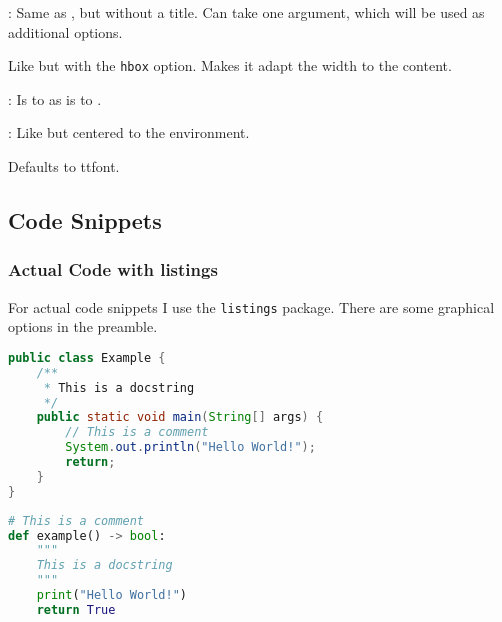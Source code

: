 \documentclass[
../../Summary.tex,
]
{subfiles}
\begin{document}
\begin{codebox*}
    : Same as , but without a title. Can take one argument, which will be used as additional options.
\end{codebox*}

\begin{smallcodebox}
    [smallcodebox]
    Like  but with the \texttt{hbox} option. Makes it adapt the width to the content.
\end{smallcodebox}

\begin{smallcodebox*}
    : Is to  as  is to .
\end{smallcodebox*}

\begin{cscb*}
    : Like  but centered to the environment.
\end{cscb*}

 Defaults to ttfont.

\subsection{Code Snippets}
\subsubsection{Actual Code with listings}
For actual code snippets I use the \texttt{listings} package. There are some graphical options in the preamble.

\begin{codebox}
    \begin{lstlisting}[language=Java]
public class Example {
    /**
     * This is a docstring
     */
    public static void main(String[] args) {
        // This is a comment
        System.out.println("Hello World!");
        return;
    }
}\end{lstlisting}
\end{codebox}

\begin{codebox}
    \begin{lstlisting}[language=Python]
# This is a comment
def example() -> bool:
    """
    This is a docstring
    """
    print("Hello World!")
    return True
\end{lstlisting}
\end{codebox}
\end{document}
